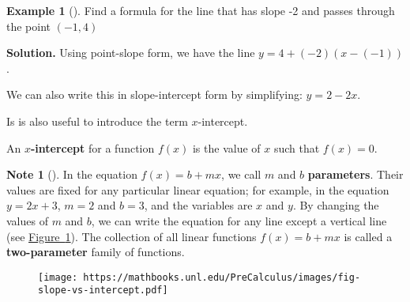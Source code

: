 \documentclass[10pt,]{book}
\newcommand{\terminology}[1]{\textbf{#1}}
\theoremstyle{plain}
\theoremstyle{definition}
\theoremstyle{definition}
\newtheorem{note}[theorem]{Note}
\theoremstyle{definition}
\newtheorem{example}[theorem]{Example}
\theoremstyle{definition}
\numberwithin{equation}{section}
\begin{document}
\begin{example}[]\label{example-point-slope2}
\hypertarget{p-82}{}%
Find a formula for the line that has slope -2 and passes through the point \((-1,4)\)%
\par\smallskip%
\noindent\textbf{Solution.}\hypertarget{solution-6}{}\quad%
\hypertarget{p-83}{}%
Using point-slope form, we have the line \(y=4+(-2)(x-(-1))\).%
\par
\hypertarget{p-84}{}%
We can also write this in slope-intercept form by simplifying: \(y=2-2x\).%
\end{example}
\hypertarget{p-85}{}%
Is is also useful to introduce the term \(x\)-intercept. \begin{assemblage}[\(x\)-intercept]\label{assemblage-7}
\hypertarget{p-86}{}%
An \terminology{\(x\)-intercept} for a function \(f(x)\) is the value of \(x\) such that \(f(x)=0\).%
\end{assemblage}
%
\begin{note}[]\label{note-1}
\hypertarget{p-87}{}%
In the equation \(f (x) = b + mx\), we call \(m\) and \(b\) \terminology{parameters}. Their values are fixed for any particular linear equation; for example, in the equation \(y = 2x + 3\), \(m = 2\) and \(b = 3\), and the variables are \(x\) and \(y\). By changing the values of \(m\) and \(b\), we can write the equation for any line except a vertical line (see \hyperref[fig-slope-vs-intercept]{Figure~\ref{fig-slope-vs-intercept}}). The collection of all linear functions \(f (x) = b + mx\) is called a \terminology{two-parameter} family of functions.%
\end{note}
\begin{figure}
\centering
\texttt{[image: https://mathbooks.unl.edu/PreCalculus/images/fig-slope-vs-intercept.pdf]}
\caption{\label{fig-slope-vs-intercept}}
\end{figure}
\typeout{************************************************}
\typeout{************************************************}
\end{document}
